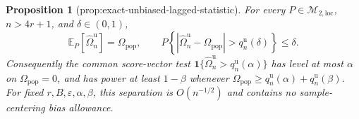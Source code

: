 \documentclass{article}
\newtheorem{proposition}{Proposition}
\begin{document}
\begin{proposition}[prop:exact-unbiased-lagged-statistic]\label{prop:exact-unbiased-lagged-statistic}
For every \(P\in\mathcal M_{2,\mathrm{loc}}\), \(n>4r+1\), and \(\delta\in(0,1)\),
\[
 \mathbb E_P[\widehat\Omega_n^{\mathrm u}]=\Omega_{\mathrm{pop}},
 \qquad
 P\!\left\{\left|\widehat\Omega_n^{\mathrm u}-\Omega_{\mathrm{pop}}\right|>
 q_n^{\mathrm u}(\delta)\right\}\le\delta.
\]
Consequently the common score-vector test
\(\mathbf 1\{\widehat\Omega_n^{\mathrm u}>q_n^{\mathrm u}(\alpha)\}\)
has level at most \(\alpha\) on \(\Omega_{\mathrm{pop}}=0\), and has power at least
\(1-\beta\) whenever
\(\Omega_{\mathrm{pop}}\ge q_n^{\mathrm u}(\alpha)+q_n^{\mathrm u}(\beta)\).
For fixed \(r,B,\varepsilon,\alpha,\beta\), this separation is \(O(n^{-1/2})\) and contains no sample-centering bias allowance.
\end{proposition}
\end{document}
